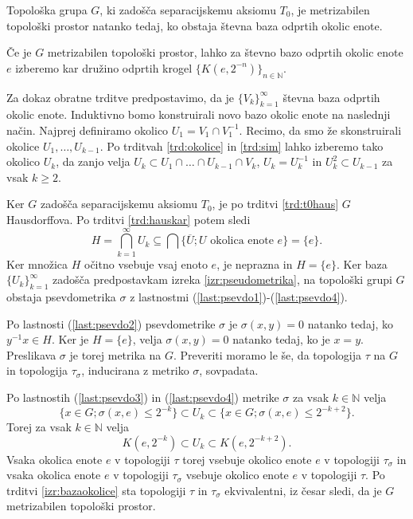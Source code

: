 \documentclass[mat1]{fmfdelo}
\newcommand{\N}{\mathbb N}
\newcommand{\closure}[1]{\overline{#1}}
\begin{document}
\begin{izrek}\label{izr:metrizabilnost}
	Topološka grupa $G$, ki zadošča separacijskemu aksiomu $T_0$, je me\-tri\-za\-bi\-len topološki prostor natanko tedaj, ko obstaja števna baza odprtih okolic enote.
\end{izrek}

\begin{dokaz}
Če je $G$ metrizabilen topološki prostor, lahko za števno bazo odprtih okolic enote $e$ izberemo kar družino odprtih krogel $\lbrace K(e, 2^{-n}) \rbrace_{n \in \N}$.

Za dokaz obratne trditve predpostavimo, da je $\lbrace V_k \rbrace_{k = 1}^\infty$ števna baza odprtih okolic enote. Induktivno bomo konstruirali novo bazo okolic enote na naslednji način. Najprej definiramo okolico $U_1 = V_1 \cap V_1^{-1}$. Recimo, da smo že skonstruirali okolice $U_1,\dots,U_{k-1}$. 
Po trditvah \ref{trd:okolice} in \ref{trd:sim} lahko
izberemo tako okolico $U_k$, da zanjo velja $U_k \subset U_1 \cap \dots \cap U_{k-1}\cap V_k$, $U_k = U_k^{-1}$ in $U_k^2 \subset U_{k-1}$ za vsak $k \geq 2$.

Ker $G$ zadošča separacijskemu aksiomu $T_0$, je po trditvi \ref{trd:t0haus} $G$ Hausdorffova. Po trditvi \ref{trd:hauskar} potem sledi
\[ H = \bigcap_{k=1}^\infty U_k \subseteq \bigcap\lbrace \closure{U} ; U \text{ okolica enote } e \rbrace = \lbrace e \rbrace. \]
Ker množica $H$ očitno vsebuje vsaj enoto $e$, je neprazna in $H = \lbrace e \rbrace$.
Ker baza $\lbrace U_k \rbrace_{k = 1}^\infty$ zadošča predpostavkam izreka \ref{izr:pseudometrika}, na topološki grupi $G$ obstaja psevdometrika $\sigma$ z lastnostmi (\ref{last:psevdo1})-(\ref{last:psevdo4}).

Po lastnosti (\ref{last:psevdo2}) psevdometrike $\sigma$ je $\sigma(x, y) = 0$ natanko tedaj, ko $y^{-1}x \in H$. Ker je $H = \lbrace e \rbrace$, velja $\sigma(x, y) = 0$ natanko tedaj, ko je $x = y$. Preslikava $\sigma$ je torej metrika na $G$. Preveriti moramo le še, da topologija $\tau$ na $G$ in topologija $\tau_\sigma$, inducirana z metriko $\sigma$, sovpadata.

Po lastnostih (\ref{last:psevdo3}) in (\ref{last:psevdo4}) metrike $\sigma$ za vsak $k \in \N$ velja
\[ \lbrace x \in G ; \sigma(x, e) \leq 2^{-k} \rbrace \subset U_k \subset \lbrace x \in G ; \sigma(x, e) \leq 2^{-k+2} \rbrace.\]
Torej za vsak $k \in \N$ velja
\[ K(e, 2^{-k}) \subset U_k \subset K(e, 2^{-k+2}). \]
Vsaka okolica enote $e$ v topologiji $\tau$ torej vsebuje okolico enote $e$ v topologiji $\tau_\sigma$ in vsaka okolica enote $e$ v topologiji $\tau_\sigma$ vsebuje okolico enote $e$ v topologiji $\tau$.
Po trditvi \ref{izr:bazaokolice} sta topologiji $\tau$ in $\tau_\sigma$  ekvivalentni, iz česar sledi, da je $G$ metrizabilen topološki prostor.
\end{dokaz}
\end{document}
